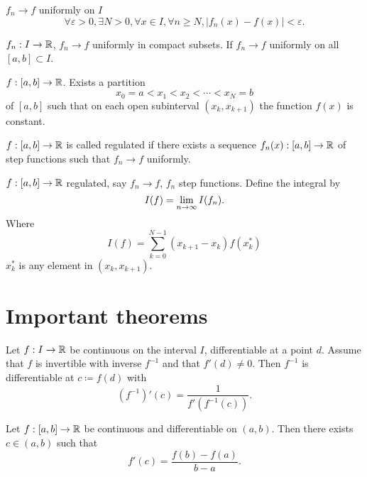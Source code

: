 \documentclass[10pt, a4paper]{article}
\begin{document}
\begin{definition}
    $f_n \to f$ uniformly on $I$
    \[
    \forall\varepsilon > 0, \exists N > 0, \forall x \in I, \forall n \geq N, |f_n(x) - f(x)| < \varepsilon.
    \]
\end{definition}

\begin{definition}
    $f_n : I \to \mathbb{R}$,
    $f_n \to f$ uniformly in compact subsets.
    If $f_n \to f$ uniformly on all $[a, b] \subset I$.
\end{definition}

\begin{definition}
    $f : [a, b] \to \mathbb{R}$.
    Exists a partition
    \[
    x_0 = a < x_1 < x_2 < \dotsi < x_N = b
    \]
    of $[a, b]$ such that on each open subinterval $(x_k, x_{k + 1})$ the function $f(x)$ is constant.
\end{definition}

\begin{definition}
    $f : [a, b] \to \mathbb{R}$ is called regulated if there exists a sequence $f_n(x) : [a, b] \to \mathbb{R}$ of step functions such that $f_n \to f$ uniformly.
\end{definition}

\begin{definition}
    $f : [a, b] \to \mathbb{R}$ regulated,
    say $f_n \to f$,
    $f_n$ step functions.
    Define the integral by
    \[
    I(f) = \lim_{n \rightarrow \infty} I(f_n).
    \]
    Where
    \[
    I(f) = \sum_{k = 0}^{N - 1}(x_{k + 1} - x_k)f(x_k ^ {*})
    \]
    $x_k ^ {*}$ is any element in $(x_k, x_{k + 1})$.
\end{definition}

\newpage

\section{Important theorems}

\begin{proposition}
    Let $f : I \to \mathbb{R}$ be continuous on the interval $I$,
    differentiable at a point $d$.
    Assume that $f$ is invertible with inverse $f ^ {-1}$ and that $f'(d) \neq 0$.
    Then $f ^ {-1}$ is differentiable at $c \coloneqq f(d)$ with
    \[
    (f ^ {-1})'(c) = \frac{1}{f'(f ^ {-1}(c))}.
    \]
\end{proposition}

\begin{theorem}
    Let $f : [a, b] \to \mathbb{R}$ be continuous and differentiable on $(a, b)$.
    Then there exists $c \in (a, b)$ such that
    \[
    f'(c) = \frac{f(b) - f(a)}{b - a}.
    \]
\end{theorem}
\end{document}
